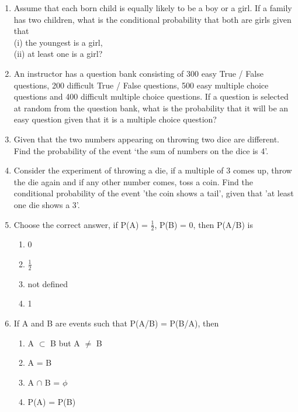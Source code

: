 \begin{enumerate}[label=\arabic*.,ref=\thesubsection.\theenumi]
\item  Assume that each born child is equally likely to be a boy or a girl. If a family has two children, what is the conditional probability that both are girls given that\\
(i) the youngest is a girl,\\ 
(ii) at least one is a girl?\\
\solution


\item  An instructor has a question bank consisting of 300 easy True / False questions,
200 difficult True / False questions, 500 easy multiple choice questions and 400 difficult multiple choice questions. If a question is selected at random from the question bank, what is the probability that it will be an easy question given that it is a multiple choice question?\\
\solution


\item  Given that the two numbers appearing on throwing two dice are different. Find the probability of the event `the sum of numbers on the dice is 4'.\\
\solution


\item Consider the experiment of throwing a die, if a multiple of 3 comes up, throw the die again and if any other number comes, toss a coin. Find the conditional probability of the event 'the coin shows a tail', given that 'at least one die shows a 3'.\\
\solution


\item Choose the correct answer, if P(A) = $\frac{1}{2}$, P(B) = 0, then P(A/B) is
\begin{enumerate}
\item 0
\item $\frac{1}{2}$
\item not defined
\item 1
\end{enumerate}
\solution


\item If A and B are events such that P(A/B) = P(B/A), then
\begin{enumerate}
\item A $\subset$ B but A $\neq$ B
\item A = B
\item A $\cap$ B = $\phi$
\item P(A) = P(B)
\end{enumerate}
\solution



\end{enumerate}
